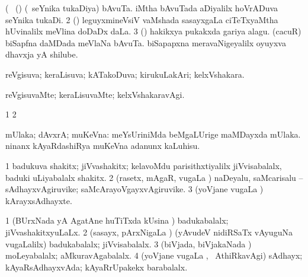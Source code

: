 \bentry
{} 
\gl{\nA}(\bava\ 
\bmng
\bnum
{} (\roVca) 
\banum
{} (\kanmu\ seYnika tukaDiya) bAvuTa. 
 iMtha bAvuTada aDiyalilx hoVrADuva seYnika tukaDi. 
\eanum
\numie
\num{2} (\savi) leguyxmineVsiV vaMshada sasayxgaLa ciTeTxyaMtha hUvinalilx meVlina doDaDx daLa. 
\num{3} (\pArxvi) hakikxya pukakxda gariya alagu. 
\banum
{} (cacuR) biSapfna daMDada meVlaNa bAvuTa. 
 biSapapxna meravaNigeyalilx oyuyxva dhavxja yA shilube. 
\eanum
\numie
\enum
\emng
\eentry

\bentry
{} 
\gl{\gu}
\expl{}
\bmng
 reVgisuva; keraLisuva; kATakoDuva; kirukuLakAri; kelxVshakara. 
\emng
\eentry

\bentry
{} 
\gl{\kirxvi}
\expl{}
\bmng
 reVgisuvaMte; keraLisuvaMte; kelxVshakaravAgi. 
\emng
\eentry

\bentry
{}
\gl{\saMkiSx}
\expl{}
\bmng
\bnum
\num{1}  
\num{2}  
\enum
\emng
\eentry

\bentry
{}
\gl{\saMkiSx}
\expl{}
\bmng
\emng
\eentry

\bentry
{}
\gl{\saMkiSx}
\expl{}
\bmng
\emng
\eentry

\bentry
{} 
\gl{\upa}
\expl{}
\bmng
 mUlaka; dAvxrA; muKeVna:  meYsUriniMda beMgaLUrige maMDayxda mUlaka.  ninanx kAyaRdashiRya muKeVna adanunx kaLuhisu. 
\emng
\eentry

\bentry
{} 
\gl{\nA}
\expl{}
\bmng
\bnum
\num{1} badukuva shakitx; jiVvashakitx; kelavoMdu parisithxtiyalilx jiVvisabalalx, baduki uLiyabalalx shakitx. 
\num{2} (rasetx, mAgaR, \mo vugaLa \vi) naDeyalu, saMcarisalu -- sAdhayxvAgiruvike; saMcArayoVgayxvAgiruvike. 
\num{3} (yoVjane \mo vugaLa \vi) kArayxsAdhayxte. 
\enum
\emng
\eentry

\bentry
{} 
\gl{\gu}
\expl{}
\bmng
\bnum
\num{1} (BUrxNada yA AgatAne huTiTxda kUsina \vi) badukabalalx; jiVvashakitxyuLaLx. 
\num{2} (sasayx, pArxNigaLa \vi) (yAvudeV nidiRSaTx vAyuguNa \mo vugaLalilx) badukabalalx; jiVvisabalalx. 
\num{3} (biVjada, biVjakaNada \vi) moLeyabalalx; aMkuravAgabalalx. 
\num{4} (yoVjane \mo vugaLa \vi, \kanmu\ AthiRkavAgi) sAdhayx; kAyaRsAdhayxvAda; kAyaRrUpakekx barabalalx. 
\enum
\emng
\eentry

